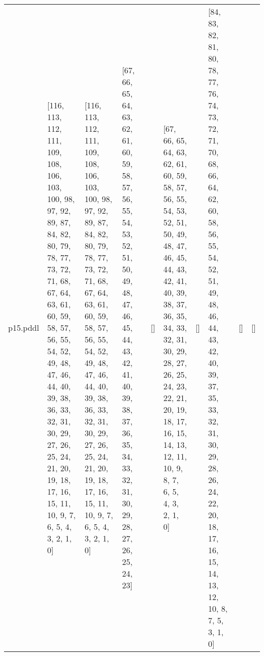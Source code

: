 \documentclass{article}
\begin{document}
\begin{tabular}{@{}lrrrrrrrrr@{}}
p15.pddl & \multicolumn{1}{|l|}{[116, 113, 112, 111, 109, 108, 106, 103, 100, 98, 97, 92, 89, 87, 84, 82, 80, 79, 78, 77, 73, 72, 71, 68, 67, 64, 63, 61, 60, 59, 58, 57, 56, 55, 54, 52, 49, 48, 47, 46, 44, 40, 39, 38, 36, 33, 32, 31, 30, 29, 27, 26, 25, 24, 21, 20, 19, 18, 17, 16, 15, 11, 10, 9, 7, 6, 5, 4, 3, 2, 1, 0]} & \multicolumn{1}{|l|}{[116, 113, 112, 111, 109, 108, 106, 103, 100, 98, 97, 92, 89, 87, 84, 82, 80, 79, 78, 77, 73, 72, 71, 68, 67, 64, 63, 61, 60, 59, 58, 57, 56, 55, 54, 52, 49, 48, 47, 46, 44, 40, 39, 38, 36, 33, 32, 31, 30, 29, 27, 26, 25, 24, 21, 20, 19, 18, 17, 16, 15, 11, 10, 9, 7, 6, 5, 4, 3, 2, 1, 0]} & \multicolumn{1}{|l|}{[67, 66, 65, 64, 63, 62, 61, 60, 59, 58, 57, 56, 55, 54, 53, 52, 51, 50, 49, 48, 47, 46, 45, 44, 43, 42, 41, 40, 39, 38, 37, 36, 35, 34, 33, 32, 31, 30, 29, 28, 27, 26, 25, 24, 23]} & \multicolumn{1}{|l|}{[]} & \multicolumn{1}{|l|}{[67, 66, 65, 64, 63, 62, 61, 60, 59, 58, 57, 56, 55, 54, 53, 52, 51, 50, 49, 48, 47, 46, 45, 44, 43, 42, 41, 40, 39, 38, 37, 36, 35, 34, 33, 32, 31, 30, 29, 28, 27, 26, 25, 24, 23, 22, 21, 20, 19, 18, 17, 16, 15, 14, 13, 12, 11, 10, 9, 8, 7, 6, 5, 4, 3, 2, 1, 0]} & \multicolumn{1}{|l|}{[]} & \multicolumn{1}{|l|}{[84, 83, 82, 81, 80, 78, 77, 76, 74, 73, 72, 71, 70, 68, 66, 64, 62, 60, 58, 56, 55, 54, 52, 51, 49, 48, 46, 44, 43, 42, 40, 39, 37, 35, 33, 32, 31, 30, 29, 28, 26, 24, 22, 20, 18, 17, 16, 15, 14, 13, 12, 10, 8, 7, 5, 3, 1, 0]} & \multicolumn{1}{|l|}{[]} & \multicolumn{1}{|l|}{[]} \\

\end{tabular}
\end{document}
